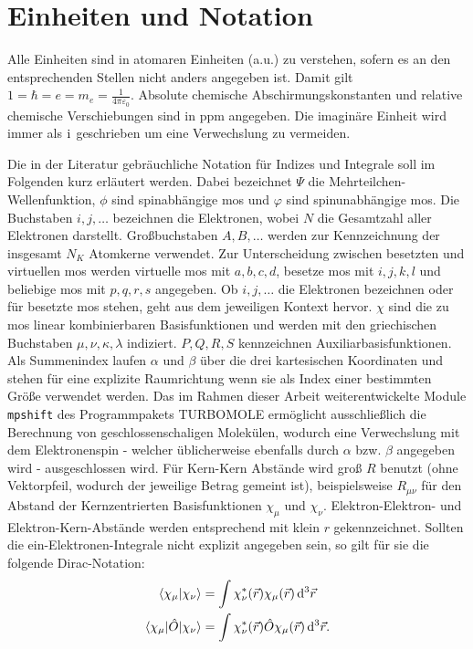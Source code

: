 \section{Einheiten und Notation}

Alle Einheiten sind in atomaren Einheiten (a.u.) zu verstehen, sofern es an den entsprechenden Stellen nicht anders angegeben ist. Damit gilt $1=\hbar=e=m_e=\frac{1}{4\pi\varepsilon_0}$.
Absolute chemische Abschirmungskonstanten und relative chemische Verschiebungen sind in \unit{ppm} angegeben. Die imaginäre Einheit wird immer als $\mathrm{i}\mkern1mu$ geschrieben um eine Verwechslung zu vermeiden.
 
\bigskip
Die in der Literatur gebräuchliche Notation für Indizes und Integrale soll im Folgenden kurz erläutert werden. Dabei bezeichnet $\Psi$ die Mehrteilchen-Wellenfunktion, $\phi$ sind spinabhängige \acp{mo} und $\varphi$ sind spinunabhängige \acp{mo}. Die Buchstaben $i,j,\dotsc$ bezeichnen die Elektronen, wobei $N$ die Gesamtzahl aller Elektronen darstellt. Großbuchstaben $A,B,\dotsc$ werden zur Kennzeichnung der insgesamt $N_K$ Atomkerne verwendet. Zur Unterscheidung zwischen besetzten und virtuellen \acp{mo} werden virtuelle \acp{mo} mit $a,b,c,d$, besetze \acp{mo} mit $i,j,k,l$ und beliebige \acp{mo} mit $p,q,r,s$ angegeben. Ob $i,j,\dotsc$ die Elektronen bezeichnen oder für besetzte \acp{mo} stehen, geht aus dem jeweiligen Kontext hervor. $\chi$ sind die zu \acp{mo} linear kombinierbaren Basisfunktionen und werden mit den griechischen Buchstaben $\mu,\nu,\kappa,\lambda$ indiziert. $P,Q,R,S$ kennzeichnen Auxiliarbasisfunktionen. Als Summenindex laufen $\alpha$ und $\beta$ über die drei kartesischen Koordinaten und stehen für eine explizite Raumrichtung wenn sie als Index einer bestimmten Größe verwendet werden. Das im Rahmen dieser Arbeit weiterentwickelte Module \texttt{mpshift} des Programmpakets \textsc{TURBOMOLE} ermöglicht ausschließlich die Berechnung von geschlossenschaligen Molekülen, wodurch eine Verwechslung mit dem Elektronenspin - welcher üblicherweise ebenfalls durch $\alpha$ bzw. $\beta$ angegeben wird - ausgeschlossen wird. Für Kern-Kern Abstände wird groß $R$ benutzt (ohne Vektorpfeil, wodurch der jeweilige Betrag gemeint ist), beispielsweise $R_{\mu\nu}$ für den Abstand der Kernzentrierten Basisfunktionen $\chi_\mu$ und $\chi_\nu$. Elektron-Elektron- und Elektron-Kern-Abstände werden entsprechend mit klein $r$ gekennzeichnet.
\newpage
Sollten die ein-Elektronen-Integrale nicht explizit angegeben sein, so gilt für sie die folgende Dirac-Notation:
\begin{gather*}
	\langle\chi_\mu\vert\chi_\nu\rangle=\int\chi_\nu^*(\vec{r})\chi_\mu(\vec{r})\mathop{}\!\mathrm{d^3}\vec{r}\\
	\langle\chi_\mu\vert\hat O\vert\chi_\nu\rangle=\int\chi_\nu^*(\vec{r})\hat O\chi_\mu(\vec{r})\mathop{}\!\mathrm{d^3}\vec{r}.
\end{gather*}

